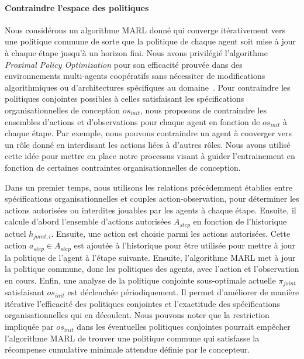 \documentclass[contribution]{jfsma}
\newcounter{relation}
\begin{document}
\paragraph{\textbf{Contraindre l'espace des politiques}}

Nous considérons un algorithme MARL donné qui converge itérativement vers une politique commune de sorte que la politique de chaque agent soit mise à jour à chaque étape jusqu'à un horizon fini.
Nous avons privilégié l'algorithme \emph{Proximal Policy Optimization} pour son efficacité prouvée dans des environnements multi-agents coopératifs sans nécessiter de modifications algorithmiques ou d'architectures spécifiques au domaine~\cite{Yu2022}.
Pour contraindre les politiques conjointes possibles à celles satisfaisant les spécifications organisationnelles de conception $os_{init}$, nous proposons de contraindre les ensembles d'actions et d'observations pour chaque agent en fonction de $os_{init}$ à chaque étape. Par exemple, nous pouvons contraindre un agent à converger vers un rôle donné en interdisant les actions liées à d’autres rôles. Nous avons utilisé cette idée pour mettre en place notre processus visant à guider l'entrainement en fonction de certaines contraintes organisationnelles de conception.

Dans un premier temps, nous utilisons les relations précédemment établies entre spécifications organisationnelles et couples action-observation, pour déterminer les actions autorisées ou interdites jouables par les agents à chaque étape.
Ensuite, il calcule d'abord l'ensemble d'actions autorisées $A_{step}$ en fonction de l'historique actuel $h_{joint,i}$. Ensuite, une action est choisie parmi les actions autorisées. Cette action $a_{step} \in A_{step}$ est ajoutée à l'historique pour être utilisée pour mettre à jour la politique de l'agent à l'étape suivante. Ensuite, l'algorithme MARL met à jour la politique commune, donc les politiques des agents, avec l'action et l'observation en cours.
Enfin, une analyse de la politique conjointe sous-optimale actuelle $\pi_{joint}$ satisfaisant $os_{init}$ est déclenchée périodiquement. Il permet d’améliorer de manière itérative l’efficacité des politiques conjointes et l’exactitude des spécifications organisationnelles qui en découlent.
Nous pouvons noter que la restriction impliquée par $os_{init}$ dans les éventuelles politiques conjointes pourrait empêcher l'algorithme MARL de trouver une politique commune qui satisfasse la récompense cumulative minimale attendue définie par le concepteur.
\end{document}
